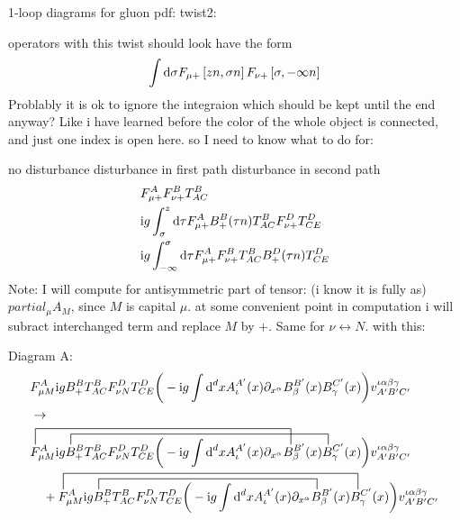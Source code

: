 \ifdefined\mainprogram{}
\else

\fi

1-loop diagrams for gluon pdf: twist2:

operators with this twist should look have the form
\begin{align}
	\int \text{d} \sigma F_{\mu+} \left[zn,\sigma n \right] F_{\nu +} \left[\sigma ,-\infty n \right]
\end{align}
Problably it is ok to ignore the integraion which should be kept until the end anyway? 
Like i have learned before the color of the whole object is connected, and just one index is open here. 
so I need to know what to do for: 

no disturbance
disturbance in first path
disturbance in second path
\begin{align}
	&F_{\mu+}^{A}  F_{\nu +}^{B} T^{B}_{AC}
	\\
	&\text{i} g \int_{\sigma}^{z} \text{d} \tau F_{\mu+}^{A} B_+^B(\tau n) T^B_{AC}  F_{\nu +}^{D}T^D_{CE}
	\\
	&\text{i} g \int_{-\infty}^{\sigma} \text{d} \tau F_{\mu+}^{A} F_{\nu +}^{B}T^{B}_{AC} B_+^D(\tau n) T^D_{CE}
\end{align}
Note: I will compute for antisymmetric part of tensor: (i know it is fully as) $partial_\mu A_M$, since $M$ is capital $\mu$. at some convenient point in computation i will subract interchanged term and replace $M$ by $+$.  Same for $\nu \leftrightarrow N$.
with this:

Diagram A:
\begin{align}
	&\ft_{\mu M}^{A} \imag g B_+^B  T^B_{AC} \ft _{\nu N}^D T^D_{CE}\bigg(-\imag g \int \ddx xA_\iota^{A'}(x) \partial_{x^\alpha} B_\beta^{B'} (x) B_\gamma^{C'}(x) \bigg) v^{\iota \alpha\beta\gamma}_{A'B'C'}
	\\
	&\rightarrow
	\\
	\contraction[3ex]{}{\ft}{_{\mu M}^{A} \imag g B_+^B  T^B_{AC} \ft _{\nu N}^D T^D_{CE}\bigg(-\imag g \int \ddx xA_\iota^{A'}(x) \partial_{x^\alpha}}{B}
	\contraction[2ex]{\ft_{\mu M}^{A} \imag g}{B}{_+^B  T^B_{AC} \ft _{\nu N}^D T^D_{CE}\bigg(-\imag g \int \ddx xA_\iota^{A'}(x) \partial_{x^\alpha} B_\beta^{B'} (x)}{B}
	&\ft_{\mu M}^{A} \imag g B_+^B  T^B_{AC} \ft _{\nu N}^D T^D_{CE}\bigg(-\imag g \int \ddx xA_\iota^{A'}(x) \partial_{x^\alpha} B_\beta^{B'} (x) B_\gamma^{C'}(x) \bigg) v^{\iota \alpha\beta\gamma}_{A'B'C'}
	\nl
	+
	\contraction[3ex]{}{\ft}{_{\mu M}^{A} \imag g B_+^B  T^B_{AC} \ft _{\nu N}^D T^D_{CE}\bigg(-\imag g \int \ddx xA_\iota^{A'}(x) \partial_{x^\alpha} B_\beta^{B'} (x)}{B}
	\contraction[2ex]{\ft_{\mu M}^{A} \imag g}{B}{_+^B  T^B_{AC} \ft _{\nu N}^D T^D_{CE}\bigg(-\imag g \int \ddx xA_\iota^{A'}(x) \partial_{x^\alpha}}{B}
	\ft_{\mu M}^{A} \imag g B_+^B  T^B_{AC} \ft _{\nu N}^D T^D_{CE}\bigg(-\imag g \int \ddx xA_\iota^{A'}(x) \partial_{x^\alpha} B_\beta^{B'} (x) B_\gamma^{C'}(x) \bigg) v^{\iota \alpha\beta\gamma}_{A'B'C'}	
\end{align}

